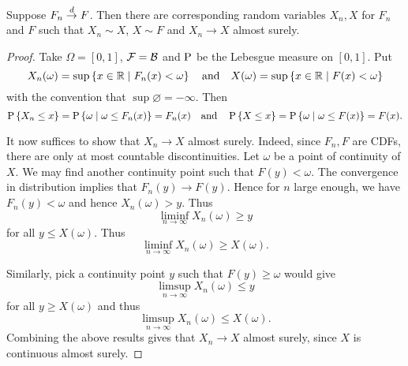 \begin{theorem}
    Suppose $F_n\dto F$. Then there are corresponding random 
    variables $X_n, X$ for $F_n$ and $F$ such that $X_n\sim X$,  
    $X\sim F$ and $X_n\to X$ almost surely. 
\end{theorem}
\begin{proof}
    Take $\Omega = [0,1]$, $\F = \B$ and $\P$ be the Lebesgue measure 
    on $[0,1]$. Put 
    \begin{equation*}
        X_n(\omega) = \sup\Set{x\in\R}{F_n(x)<\omega} 
        \quad\text{and}\quad 
        X(\omega) = \sup\Set{x\in\R}{F(x)<\omega}
    \end{equation*}
    with the convention that $\sup\varnothing = -\infty$. 
    Then 
    \begin{equation*}
        \P\set{X_n\leq x} = \P\Set{\omega}{\omega\leq F_n(x)} 
        = F_n(x)
        \quad\text{and}\quad 
        \P\set{X\leq x} = \P\Set{\omega}{\omega\leq F(x)} 
        = F(x). 
    \end{equation*}

    It now suffices to show that $X_n\to X$ almost surely. 
    Indeed, since $F_n, F$ are CDFs, there are only at most 
    countable discontinuities. Let $\omega$ be a point of continuity 
    of $X$. We may find another continuity point such that 
    $F(y)<\omega$. The convergence in distribution implies that 
    $F_n(y)\to F(y)$. Hence for $n$ large enough, we have 
    $F_n(y)<\omega$ and hence $X_n(\omega)>y$. Thus 
    \begin{equation*}
        \liminf_{n\to\infty} X_n(\omega) \geq y
    \end{equation*}
    for all $y\leq X(\omega)$. Thus 
    \begin{equation*}
        \liminf_{n\to\infty} X_n(\omega) \geq X(\omega). 
    \end{equation*}

    Similarly, pick a continuity point $y$ such that $F(y)\geq \omega$ 
    would give 
    \begin{equation*}
        \limsup_{n\to\infty} X_n(\omega)\leq y
    \end{equation*}
    for all $y\geq X(\omega)$ and thus 
    \begin{equation*}
        \limsup_{n\to\infty} X_n(\omega)\leq X(\omega). 
    \end{equation*}
    Combining the above results gives that $X_n\to X$ almost 
    surely, since $X$ is continuous almost surely. 
\end{proof}

